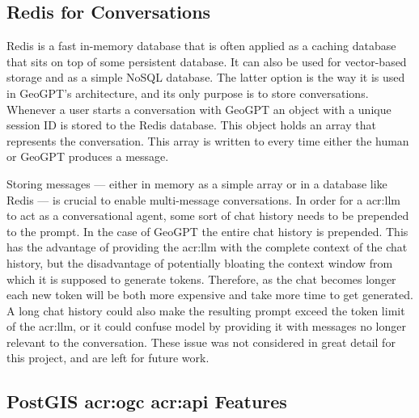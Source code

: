 \subsection{Redis for Conversations}

Redis \citep{sanfilippoRedisRealtimeData2009} is a fast in-memory database that is often applied as a caching database that sits on top of some persistent database. It can also be used for vector-based storage and as a simple NoSQL database. The latter option is the way it is used in GeoGPT's architecture, and its only purpose is to store conversations. Whenever a user starts a conversation with GeoGPT an object with a unique session ID is stored to the Redis database. This object holds an array that represents the conversation. This array is written to every time either the human or GeoGPT produces a message.

Storing messages --- either in memory as a simple array or in a database like Redis --- is crucial to enable multi-message conversations. In order for a \gls{acr:llm} to act as a conversational agent, some sort of chat history needs to be prepended to the prompt. In the case of GeoGPT the entire chat history is prepended. This has the advantage of providing the \gls{acr:llm} with the complete context of the chat history, but the disadvantage of potentially bloating the context window from which it is supposed to generate tokens. Therefore, as the chat becomes longer each new token will be both more expensive and take more time to get generated. A long chat history could also make the resulting prompt exceed the token limit of the \gls{acr:llm}, or it could confuse model by providing it with messages no longer relevant to the conversation. These issue was not considered in great detail for this project, and are left for future work.

\subsection[PostGIS and OGC API Features]{PostGIS \acrshort{acr:ogc} \acrshort{acr:api} Features}

